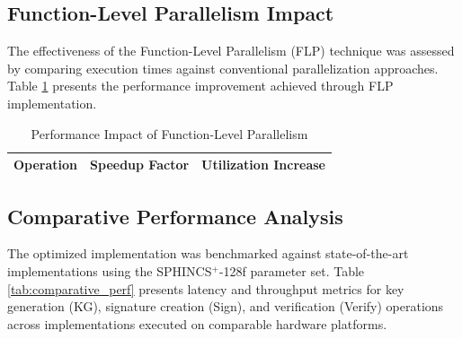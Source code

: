 \documentclass[journal]{IEEEtran}
\begin{document}
\subsection{Function-Level Parallelism Impact}

The effectiveness of the Function-Level Parallelism (FLP) technique was assessed by comparing execution times against conventional parallelization approaches. Table \ref{tab:flp_impact} presents the performance improvement achieved through FLP implementation.

\begin{table}[h]
  \centering
  \caption{Performance Impact of Function-Level Parallelism}
  \label{tab:flp_impact}
  \begin{tabular}{@{}lcc@{}}
    \toprule
    \textbf{Operation} & \textbf{Speedup Factor} & \textbf{Utilization Increase} \\
    \midrule
    \bottomrule
  \end{tabular}
\end{table}

\subsection{Comparative Performance Analysis}

The optimized implementation was benchmarked against state-of-the-art implementations using the SPHINCS$^+$-128f parameter set. Table \ref{tab:comparative_perf} presents latency and throughput metrics for key generation (KG), signature creation (Sign), and verification (Verify) operations across implementations executed on comparable hardware platforms.
\end{document}
